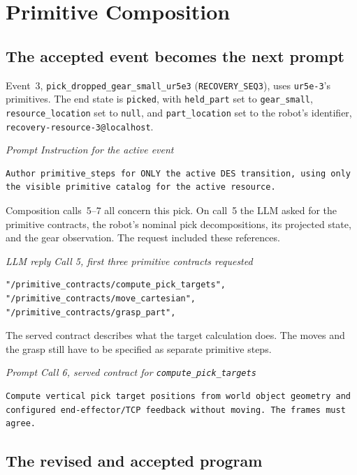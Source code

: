 \documentclass[preprint,12pt,authoryear]{elsarticle}
\let\code\nolinkurl
\newcommand{\recordlabel}[1]{\par\Needspace{4\baselineskip}\smallskip
  {\small\itshape #1\par}\nopagebreak}
\begin{document}
\section{Primitive Composition}
\setcounter{table}{0}
\renewcommand*{\theHtable}{B.\arabic{table}}
\subsection{The accepted event becomes the next prompt}\label{sec:composition-case}

Event~3, \code{pick_dropped_gear_small_ur5e3} (\code{RECOVERY_SEQ3}), uses
\code{ur5e-3}'s primitives. The end state is \code{picked}, with
\code{held_part} set to \code{gear_small}, \code{resource_location} set to
\code{null}, and \code{part_location} set to the robot's identifier,
\code{recovery-resource-3@localhost}.

\recordlabel{Prompt \enspace Instruction for the active event}
\begin{lstlisting}
Author primitive_steps for ONLY the active DES transition, using only the visible primitive catalog for the active resource.
\end{lstlisting}

Composition calls~5--7 all concern this pick. On call~5 the LLM asked for the
primitive contracts, the robot's nominal pick decompositions, its projected
state, and the gear observation. The request included these references.

\recordlabel{LLM reply \enspace Call 5, first three primitive contracts requested}
\begin{lstlisting}
"/primitive_contracts/compute_pick_targets",
"/primitive_contracts/move_cartesian",
"/primitive_contracts/grasp_part",
\end{lstlisting}

The served contract describes what the target calculation does. The moves and
the grasp still have to be specified as separate primitive steps.

\recordlabel{Prompt \enspace Call 6, served contract for \texttt{compute\_pick\_targets}}
\begin{lstlisting}
Compute vertical pick target positions from world object geometry and configured end-effector/TCP feedback without moving. The frames must agree.
\end{lstlisting}

\subsection{The revised and accepted program}\label{sec:pick-program}
\end{document}
